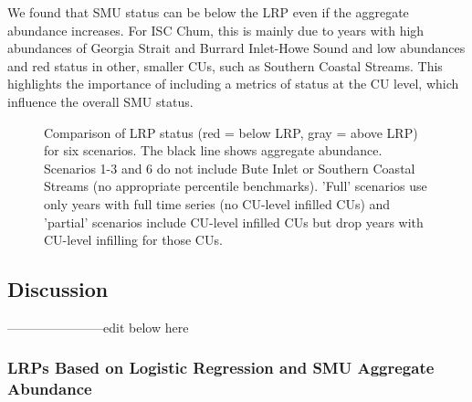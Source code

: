 \documentclass[11pt]{book}
\begin{document}
We found that SMU status can be below the LRP even if the aggregate abundance increases. For ISC Chum, this is mainly due to years with high abundances of Georgia Strait and Burrard Inlet-Howe Sound and low abundances and red status in other, smaller CUs, such as Southern Coastal Streams. This highlights the importance of including a metrics of status at the CU level, which influence the overall SMU status.
\begin{figure}[htb]

{\centering {} 

}

\caption{Comparison of LRP status (red = below LRP, gray = above LRP) for six scenarios. The black line shows aggregate abundance. Scenarios 1-3 and 6 do not include Bute Inlet or Southern Coastal Streams (no appropriate percentile benchmarks). 'Full' scenarios use only years with full time series (no CU-level infilled CUs) and 'partial' scenarios include CU-level infilled CUs but drop years with CU-level infilling for those CUs.}\label{fig:chum-LRP-compare}
\end{figure}
\hypertarget{discussion-1}{%
\subsection{Discussion}\label{discussion-1}}

-----------------------edit below here

\hypertarget{lrps-based-on-logistic-regression-and-smu-aggregate-abundance}{%
\subsubsection{LRPs Based on Logistic Regression and SMU Aggregate Abundance}\label{lrps-based-on-logistic-regression-and-smu-aggregate-abundance}}
\end{document}
